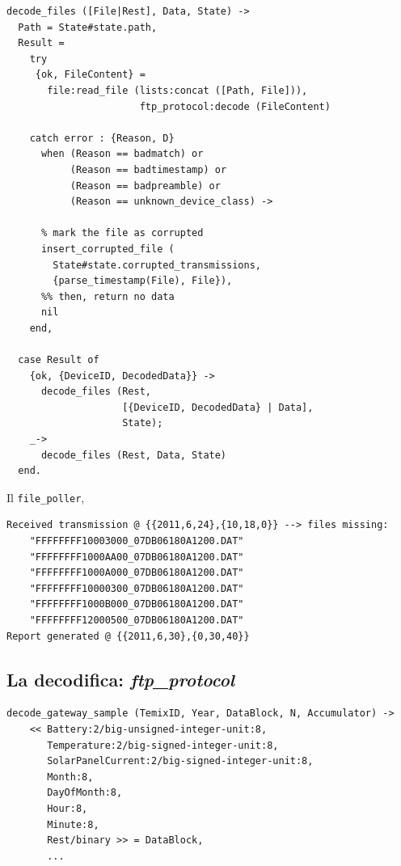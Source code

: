 %
\begin{lstlisting}[caption={Decodifica dei dati}, label={code:decode_files},frame=trBL]
decode_files ([File|Rest], Data, State) ->
  Path = State#state.path,
  Result = 
    try
     {ok, FileContent} = 
       file:read_file (lists:concat ([Path, File])),
                       ftp_protocol:decode (FileContent)
		
    catch error : {Reason, D} 
      when (Reason == badmatch) or 
           (Reason == badtimestamp) or
           (Reason == badpreamble) or 
           (Reason == unknown_device_class) -> 
		
      % mark the file as corrupted
      insert_corrupted_file (
        State#state.corrupted_transmissions,
    	{parse_timestamp(File), File}), 
      %% then, return no data
      nil
    end,
    
  case Result of 
    {ok, {DeviceID, DecodedData}} ->
      decode_files (Rest, 
                    [{DeviceID, DecodedData} | Data], 
                    State);
    _->
      decode_files (Rest, Data, State)
  end.
\end{lstlisting}
%
Il \texttt{file\_poller}, %

%
\begin{lstlisting}[caption={Esempio di report per dati mancanti}, label={code:report-missing-files},frame=trBL]
Received transmission @ {{2011,6,24},{10,18,0}} --> files missing:
    "FFFFFFFF10003000_07DB06180A1200.DAT"
    "FFFFFFFF1000AA00_07DB06180A1200.DAT"
    "FFFFFFFF1000A000_07DB06180A1200.DAT"
    "FFFFFFFF10000300_07DB06180A1200.DAT"
    "FFFFFFFF1000B000_07DB06180A1200.DAT"
    "FFFFFFFF12000500_07DB06180A1200.DAT"
Report generated @ {{2011,6,30},{0,30,40}}
\end{lstlisting}
%

%
\subsection{La decodifica: \emph{ftp\_protocol}}
\begin{lstlisting}[caption={Decodifica di un blocco dati del Gateway}, label={code:decode-gateway},frame=trBL]
decode_gateway_sample (TemixID, Year, DataBlock, N, Accumulator) ->
    << Battery:2/big-unsigned-integer-unit:8,
       Temperature:2/big-signed-integer-unit:8,
       SolarPanelCurrent:2/big-signed-integer-unit:8,
       Month:8,
       DayOfMonth:8,
       Hour:8,
       Minute:8,
       Rest/binary >> = DataBlock,
       ...
\end{lstlisting}


